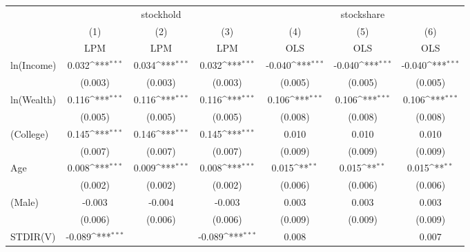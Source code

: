 {
\def\sym#1{\ifmmode^{#1}\else\(^{#1}\)\fi}
\begin{tabular*}{\textwidth}{l@{\extracolsep{\fill}}*{6}{c}}
\toprule
                &\multicolumn{3}{c}{stockhold}                           &\multicolumn{3}{c}{stockshare}                          \\
                &\multicolumn{1}{c}{(1)}&\multicolumn{1}{c}{(2)}&\multicolumn{1}{c}{(3)}&\multicolumn{1}{c}{(4)}&\multicolumn{1}{c}{(5)}&\multicolumn{1}{c}{(6)}\\
                &\multicolumn{1}{c}{LPM}&\multicolumn{1}{c}{LPM}&\multicolumn{1}{c}{LPM}&\multicolumn{1}{c}{OLS}&\multicolumn{1}{c}{OLS}&\multicolumn{1}{c}{OLS}\\
\midrule
ln(Income)      &    0.032\sym{***}&    0.034\sym{***}&    0.032\sym{***}&   -0.040\sym{***}&   -0.040\sym{***}&   -0.040\sym{***}\\
                &  (0.003)         &  (0.003)         &  (0.003)         &  (0.005)         &  (0.005)         &  (0.005)         \\
\addlinespace
ln(Wealth)      &    0.116\sym{***}&    0.116\sym{***}&    0.116\sym{***}&    0.106\sym{***}&    0.106\sym{***}&    0.106\sym{***}\\
                &  (0.005)         &  (0.005)         &  (0.005)         &  (0.008)         &  (0.008)         &  (0.008)         \\
\addlinespace
1(College)      &    0.145\sym{***}&    0.146\sym{***}&    0.145\sym{***}&    0.010         &    0.010         &    0.010         \\
                &  (0.007)         &  (0.007)         &  (0.007)         &  (0.009)         &  (0.009)         &  (0.009)         \\
\addlinespace
Age             &    0.008\sym{***}&    0.009\sym{***}&    0.008\sym{***}&    0.015\sym{**} &    0.015\sym{**} &    0.015\sym{**} \\
                &  (0.002)         &  (0.002)         &  (0.002)         &  (0.006)         &  (0.006)         &  (0.006)         \\
\addlinespace
1(Male)         &   -0.003         &   -0.004         &   -0.003         &    0.003         &    0.003         &    0.003         \\
                &  (0.006)         &  (0.006)         &  (0.006)         &  (0.009)         &  (0.009)         &  (0.009)         \\
\addlinespace
STDIR(V)        &   -0.089\sym{***}&                  &   -0.089\sym{***}&    0.008         &                  &    0.007         \\

\end{tabular*}}
